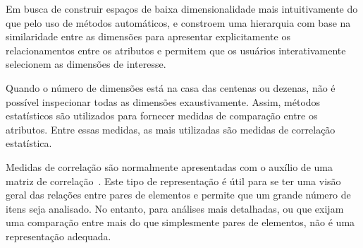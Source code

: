
Em busca de construir espaços de baixa dimensionalidade mais intuitivamente do que pelo uso de métodos automáticos, \cite{Yang2003} e \cite{Ward2003} constroem uma hierarquia com base na similaridade entre as dimensões para apresentar explicitamente os relacionamentos entre os atributos e permitem que os usuários interativamente selecionem as dimensões de interesse. 




Quando o número de dimensões está na casa das centenas ou dezenas, não é possível inspecionar todas as dimensões exaustivamente. Assim, métodos estatísticos são utilizados para fornecer medidas de comparação entre os atributos. Entre essas medidas, as mais utilizadas são medidas de correlação estatística.

Medidas de correlação são normalmente apresentadas com o auxílio de uma matriz de correlação~\cite{Friendly2002}. Este tipo de representação é útil para se ter uma visão geral das relações entre pares de elementos e permite que um grande número de itens seja analisado. No entanto, para análises mais detalhadas, ou que exijam uma comparação entre mais do que simplesmente pares de elementos, não é uma representação adequada.

